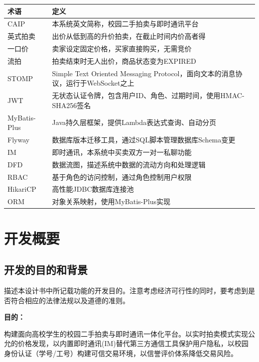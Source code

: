 \documentclass[12pt,a4paper]{ctexart}
\numberwithin{figure}{section}
\numberwithin{table}{section}
\begin{document}
\begin{center}
\renewcommand{\arraystretch}{1.3}
\begin{tabular}{|p{3cm}|p{11cm}|}
\hline
\rowcolor{tableheader}
\textbf{术语} & \textbf{定义} \\
\hline
CAIP & 本系统英文简称，校园二手拍卖与即时通讯平台 \\
\hline
英式拍卖 & 出价从低到高的升价拍卖，在截止时间内价高者得 \\
\hline
一口价 & 卖家设定固定价格，买家直接购买，无需竞价 \\
\hline
流拍 & 拍卖结束时无人出价，商品状态变为EXPIRED \\
\hline
STOMP & Simple Text Oriented Messaging Protocol，面向文本的消息协议，运行于WebSocket之上 \\
\hline
JWT & 无状态认证令牌，包含用户ID、角色、过期时间，使用HMAC-SHA256签名 \\
\hline
MyBatis-Plus & Java持久层框架，提供Lambda表达式查询、自动分页 \\
\hline
Flyway & 数据库版本迁移工具，通过SQL脚本管理数据库Schema变更 \\
\hline
IM & 即时通讯，本系统中买卖双方一对一私聊功能 \\
\hline
DFD & 数据流图，描述系统中数据的流动方向和处理逻辑 \\
\hline
RBAC & 基于角色的访问控制，通过角色控制用户权限 \\
\hline
HikariCP & 高性能JDBC数据库连接池 \\
\hline
ORM & 对象关系映射，使用MyBatis-Plus实现 \\
\hline
\end{tabular}
\end{center}

\section{开发概要}

\subsection{开发的目的和背景}

描述本设计书中所记载功能的开发目的。注意考虑经济可行性的同时，要考虑到是否符合相应的法律法规以及道德的准则。

\textbf{目的：}

构建面向高校学生的校园二手拍卖与即时通讯一体化平台。以实时拍卖模式实现公允的价格发现，以内置即时通讯(IM)替代第三方通信工具保护用户隐私，以校园身份认证（学号/工号）构建可信交易环境，以信誉评价体系降低交易风险。
\end{document}
